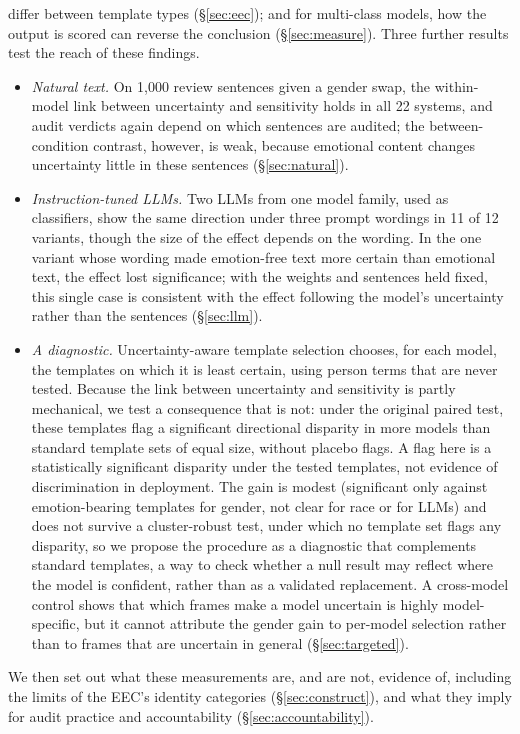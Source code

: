\documentclass[runningheads]{llncs}
\begin{document}
differ between template types (\S\ref{sec:eec}); and for multi-class
models, how the output is scored can reverse the conclusion
(\S\ref{sec:measure}). Three further results test the reach of these findings.
\begin{itemize}
  \item \emph{Natural text.} On 1,000 review sentences given a gender swap, the
  within-model link between uncertainty and sensitivity holds in all 22
  systems, and audit verdicts again depend on which sentences are audited; the
  between-condition contrast, however, is weak, because emotional content
  changes uncertainty little in these sentences (\S\ref{sec:natural}).
  \item \emph{Instruction-tuned LLMs.} Two LLMs from one model family, used as
  classifiers, show the same direction under three prompt wordings in 11 of 12
  variants, though the size of the effect depends on the wording. In the one
  variant whose wording made emotion-free text more certain than emotional
  text, the effect lost significance; with the weights and sentences held
  fixed, this single case is consistent with the effect following the model's
  uncertainty rather than the sentences (\S\ref{sec:llm}).
  \item \emph{A diagnostic.} Uncertainty-aware template selection chooses, for
  each model, the templates on which it is least certain, using person terms
  that are never tested. Because the link between uncertainty and sensitivity
  is partly mechanical, we test a consequence that is not: under the original
  paired test, these templates flag a significant directional disparity in
  more models than standard template sets of equal size, without placebo
  flags. A flag here is a statistically significant disparity under
  the tested templates, not evidence of discrimination in deployment. The gain
  is modest (significant only against emotion-bearing templates for gender, not
  clear for race or for LLMs) and does not survive a cluster-robust test, under
  which no template set flags any disparity, so we propose
  the procedure as a diagnostic that complements standard templates, a way to
  check whether a null result may reflect where the model is confident, rather
  than as a validated replacement. A cross-model control shows that which
  frames make a model uncertain is highly model-specific, but it cannot
  attribute the gender gain to per-model selection rather than to frames that
  are uncertain in general (\S\ref{sec:targeted}).
\end{itemize}
We then set out what these measurements are, and are not, evidence of,
including the limits of the EEC's identity categories (\S\ref{sec:construct}),
and what they imply for audit practice and accountability
(\S\ref{sec:accountability}).
\end{document}

